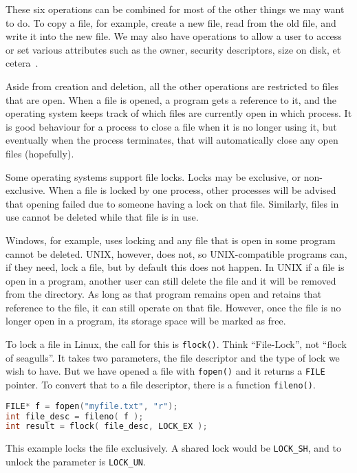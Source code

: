 These six operations can be combined for most of the other things we may want to do. To copy a file, for example, create a new file, read from the old file, and write it into the new file. We may also have operations to allow a user to access or set various attributes such as the owner, security descriptors, size on disk, et cetera~\cite{osc}.

Aside from creation and deletion, all the other operations are restricted to files that are open. When a file is opened, a program gets a reference to it, and the operating system keeps track of which files are currently open in which process. It is good behaviour for a process to close a file when it is no longer using it, but eventually when the process terminates, that will automatically close any open files (hopefully).

Some operating systems support file locks. Locks may be exclusive, or non-exclusive. When a file is locked by one process, other processes will be advised that opening failed due to someone having a lock on that file. Similarly, files in use cannot be deleted while that file is in use.

Windows, for example, uses locking and any file that is open in some program cannot be deleted. UNIX, however, does not, so UNIX-compatible programs can, if they need, lock a file, but by default this does not happen. In UNIX if a file is open in a program, another user can still delete the file and it will be removed from the directory. As long as that program remains open and retains that reference to the file, it can still operate on that file. However, once the file is no longer open in a program, its storage space will be marked as free.

To lock a file in Linux, the call for this is \texttt{flock()}. Think ``File-Lock'', not ``flock of seagulls''. It takes two parameters, the file descriptor and the type of lock we wish to have. But we have opened a file with \texttt{fopen()} and it returns a \texttt{FILE} pointer. To convert that to a file descriptor, there is a function \texttt{fileno()}.

\begin{lstlisting}[language=C]
FILE* f = fopen("myfile.txt", "r");
int file_desc = fileno( f );
int result = flock( file_desc, LOCK_EX );
\end{lstlisting}

This example locks the file exclusively. A shared lock would be \texttt{LOCK\_SH}, and to unlock the parameter is \texttt{LOCK\_UN}.

